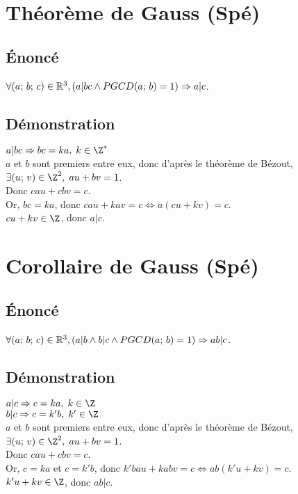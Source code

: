 \documentclass[12px]{article}
\begin{document}
	\section{Théorème de Gauss (Spé)}
	
	\subsection{\'Enoncé}
	$\forall(a;\, b;\, c)\in\mathbb{R}^3, (a|bc\wedge PGCD(a;\, b)=1)\Rightarrow a|c$.
	
	\subsection{Démonstration}
	$a|bc \Rightarrow bc=ka,\; k\in\Z^*$\\
	$a$ et $b$ sont premiers entre eux, donc d'après le théorème de Bézout, $\E(u;\, v)\in\Z^2,\; au+bv=1$.\\
	Donc $cau+cbv=c$.\\
	Or, $bc=ka$, donc $cau+kav=c \Leftrightarrow a(cu+kv)=c$.\\
	$cu+kv\in\Z$, donc $a|c$.
	
	\section{Corollaire de Gauss (Spé)}
	
	\subsection{\'Enoncé}
	$\forall(a;\, b;\, c)\in\mathbb{R}^3, (a|b\wedge b|c\wedge PGCD(a;\, b)=1)\Rightarrow ab|c$.
	
	\subsection{Démonstration}
	$a|c \Rightarrow c=ka,\; k\in\Z$\\
	$b|c \Rightarrow c=k'b,\; k'\in\Z$\\
	$a$ et $b$ sont premiers entre eux, donc d'après le théorème de Bézout, $\E(u;\, v)\in\Z^2,\; au+bv=1$.\\
	Donc $cau+cbv=c$.\\
	Or, $c=ka$ et $c=k'b$, donc $k'bau+kabv=c \Leftrightarrow ab(k'u+kv)=c$.\\
	$k'u+kv\in\Z$, donc $ab|c$.
	
\end{document}
